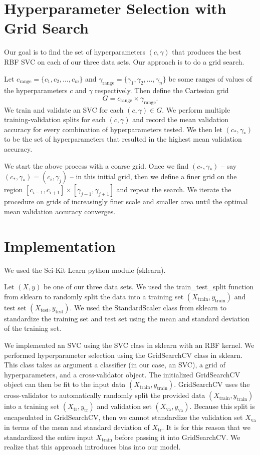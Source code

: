 \documentclass[12pt]{article}
\newcommand{\Xtrain}{X_{\mbox{train}}}
\newcommand{\ytrain}{y_{\mbox{train}}}
\newcommand{\Xtest}{X_{\mbox{test}}}
\newcommand{\ytest}{y_{\mbox{test}}}
\newcommand{\Xtr}{X_{\mbox{tr}}}
\newcommand{\ytr}{y_{\mbox{tr}}}
\newcommand{\Xva}{X_{\mbox{va}}}
\newcommand{\yva}{y_{\mbox{va}}}
\newcommand{\crange}{c_{\mbox{range}}}
\newcommand{\gamrange}{\gamma_{\mbox{range}}}
\begin{document}
\section{Hyperparameter Selection with Grid Search}

Our goal is to find the set of hyperparameters $(c, \gamma)$ that produces the best RBF SVC on each of our three data sets. Our approach is to do a grid search.

Let $\crange = \{c_1,c_2,\ldots,c_m\}$ and $\gamrange = \{\gamma_1,\gamma_2,\ldots,\gamma_n\}$ be some ranges of values of the hyperparameters $c$ and $\gamma$ respectively. Then define the Cartesian grid
\[ G = \crange \times \gamrange. \]
We train and validate an SVC for each $(c, \gamma)\in G$. We perform multiple training-validation splits for each $(c, \gamma)$ and record the mean validation accuracy for every combination of hyperparameters tested. We then let $(c_*, \gamma_*)$ to be the set of hyperparameters that resulted in the highest mean validation accuracy.

We start the above process with a coarse grid. Once we find $(c_*, \gamma_*)$ -- say $(c_*, \gamma_*)=(c_i, \gamma_j)$ -- in this initial grid, then we define a finer grid on the region $[c_{i-1}, c_{i+1}]\times [\gamma_{j-1}, \gamma_{j+1}]$ and repeat the search. We iterate the procedure on grids of increasingly finer scale and smaller area until the optimal mean validation accuracy converges.


\section{Implementation}
\label{implementation}

We used the Sci-Kit Learn python module (sklearn).

Let $(X, y)$ be one of our three data sets. We used the train\_test\_split function from sklearn to randomly split the data into a training set $(\Xtrain, \ytrain)$ and test set $(\Xtest, \ytest)$. We used the StandardScaler class from sklearn to standardize the training set and test set using the mean and standard deviation of the training set.

We implemented an SVC using the SVC class in sklearn with an RBF kernel. We performed hyperparameter selection using the GridSearchCV class in sklearn. This class takes as argument a classifier (in our case, an SVC), a grid of hyperparameters, and a cross-validator object. The initialized GridSearchCV object can then be fit to the input data $(\Xtrain, \ytrain)$. GridSearchCV uses the cross-validator to automatically randomly split the provided data $(\Xtrain, \ytrain)$ into a training set $(\Xtr, \ytr)$ and validation set $(\Xva, \yva)$. Because this split is encapsulated in GridSearchCV, then we cannot standardize the validation set $\Xva$ in terms of the mean and standard deviation of $\Xtr$. It is for this reason that we standardized the entire input $\Xtrain$ before passing it into GridSearchCV. We realize that this approach introduces bias into our model.
\end{document}
